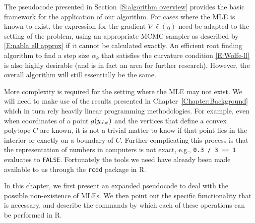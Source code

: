The pseudocode presented in Section~\ref{S:algorithm overview} provides the basic framework for the application of our algorithm.
For cases where the MLE is known to exist, the expression for the gradient $\nabla \ell(\eta)$ need be adapted to the setting of the problem, using an appropriate MCMC sampler as described by \eqref{E:nabla ell approx} if it cannot be calculated exactly.  
An efficient root finding algorithm to find a step size $\alpha_k$ that satisfies the curvature condition \eqref{E:Wolfe-ll} is also highly desirable (and is in fact
an area for further research).  However, the overall algorithm
will still essentially be the same.

More complexity is required for the setting where the MLE may not exist.  We will need 
to make use of the results presented in Chapter~\ref{Chapter:Background} which in turn 
rely heavily linear programming methodologies.  For example, even when coordinates 
of a point $g(y_{\text{obs}})$ and the vertices that define a convex polytope $C$ are known, it 
is not a trivial matter to know if that point lies in the interior or exactly on 
a boundary of $C$.  Further complicating this process is that the representation of 
numbers in computers is not exact, e.g., \texttt{0.3 / 3 == 1} evaluates
to \texttt{FALSE}.  Fortunately the tools we need have already been made available to us through the \texttt{rcdd} package \citep{rcdd:R} in R.  

In this chapter, we first present an expanded pseudocode to deal with the possible
non-existence of MLEs.  We then point out the specific functionality that is necessary,
and describe the commands by which each of these operations can be performed in R.

